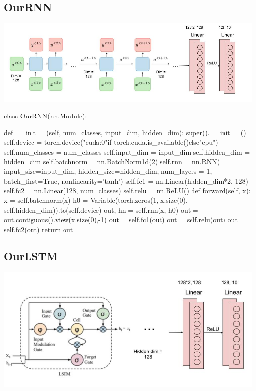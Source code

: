 \documentclass[12pt,a4paper]{article}
\begin{document}
    \subsection{OurRNN}
      \begin{center}
            \includegraphics[width= 400pt]{imgs/rnn.jpg}
        \end{center}
    \begin{python}
    class OurRNN(nn.Module):

    def __init__(self, num_classes, input_dim, hidden_dim):
        super().__init__()
        self.device = torch.device("cuda:0"if torch.cuda.is_available()else"cpu")
        self.num_classes = num_classes
        self.input_dim = input_dim
        self.hidden_dim = hidden_dim
        self.batchnorm = nn.BatchNorm1d(2)
        self.rnn = nn.RNN(
            input_size=input_dim, 
            hidden_size=hidden_dim,
            num_layers = 1, 
            batch_first=True,
            nonlinearity='tanh')
        self.fc1 = nn.Linear(hidden_dim*2, 128)
        self.fc2 = nn.Linear(128, num_classes)
        self.relu = nn.ReLU()
    def forward(self, x):
        x = self.batchnorm(x)
        h0 = Variable(torch.zeros(1, x.size(0), self.hidden_dim)).to(self.device)
        out, hn = self.rnn(x, h0)
        out = out.contiguous().view(x.size(0),-1)
        out = self.fc1(out)
        out = self.relu(out)
        out = self.fc2(out)
        return out
    \end{python}
    \newpage

    \subsection{OurLSTM}

    \begin{center}
            \includegraphics[width= 400pt]{imgs/lstm.jpg}
        \end{center}
    
\end{document}
